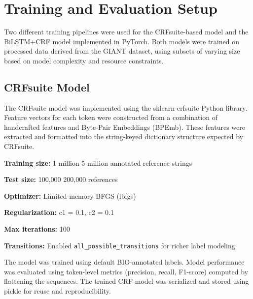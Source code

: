 \section{Training and Evaluation Setup}
Two different training pipelines were used for the CRFsuite-based model and the BiLSTM+CRF model implemented in PyTorch. Both models were trained on processed data derived from the GIANT dataset, using subsets of varying size based on model complexity and resource constraints.
\subsection{CRFsuite Model}
The CRFsuite model was implemented using the sklearn-crfsuite Python library. Feature vectors for each token were constructed from a combination of handcrafted features and Byte-Pair Embeddings (BPEmb). These features were extracted and formatted into the string-keyed dictionary structure expected by CRFsuite.
\begin{compactitem}
\item \textbf{Training size:} 1 million \/ 5 million annotated reference strings
\item \textbf{Test size:} 100,000 \/ 200,000 references
\item \textbf{Optimizer:} Limited-memory BFGS (lbfgs)
\item \textbf{Regularization:} c1 = 0.1, c2 = 0.1
\item \textbf{Max iterations:} 100
\item \textbf{Transitions:} Enabled \texttt{all\_possible\_transitions} for richer label modeling
\end{compactitem}
The model was trained using default BIO-annotated labels. Model performance was evaluated using token-level metrics (precision, recall, F1-score) computed by flattening the sequences. The trained CRF model was serialized and stored using pickle for reuse and reproducibility.


